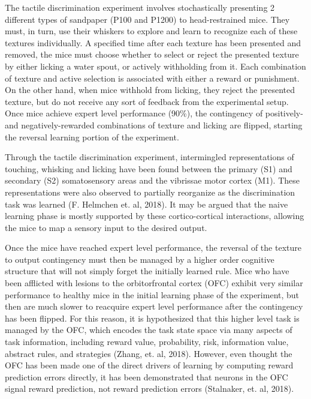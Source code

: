 \documentclass[11pt]{article}
\begin{document}
The tactile discrimination experiment involves stochastically presenting 2 different types of sandpaper (P100 and P1200) to head-restrained mice.  They must, in turn, use their whiskers to explore and learn to recognize each of these textures individually.  A specified time after each texture has been presented and removed, the mice must choose whether to select or reject the presented texture by either licking a water spout, or actively withholding from it.  Each combination of texture and active selection is associated with either a reward or punishment.  On the other hand, when mice withhold from licking, they reject the presented texture, but do not receive any sort of feedback from the experimental setup.  Once mice achieve expert level performance (90\%), the contingency of positively- and negatively-rewarded combinations of texture and licking are flipped, starting the reversal learning portion of the experiment.

Through the tactile discrimination experiment, intermingled representations of touching, whisking and licking have been found between the primary (S1) and secondary (S2) somatosensory areas and the vibrissae motor cortex (M1).  These representations were also observed to partially reorganize as the discrimination task was learned (F. Helmchen et. al, 2018).  It may be argued that the naive learning phase is mostly supported by these cortico-cortical interactions, allowing the mice to map a sensory input to the desired output.

Once the mice have reached expert level performance, the reversal of the texture to output contingency must then be managed by a higher order cognitive structure that will not simply forget the initially learned rule.  Mice who have been afflicted with lesions to the orbitorfrontal cortex (OFC) exhibit very similar performance to healthy mice in the initial learning phase of the experiment, but then are much slower to reacquire expert level performance after the contingency has been flipped.  For this reason, it is hypothesized that this higher level task is managed by the OFC, which encodes the task state space via many aspects of task information, including reward value, probability, risk, information value, abstract rules, and strategies (Zhang, et. al, 2018).  However, even thought the OFC has been made one of the direct drivers of learning by computing reward prediction errors directly, it has been demonstrated that neurons in the OFC signal reward prediction, not reward prediction errors (Stalnaker, et. al, 2018).
\end{document}
